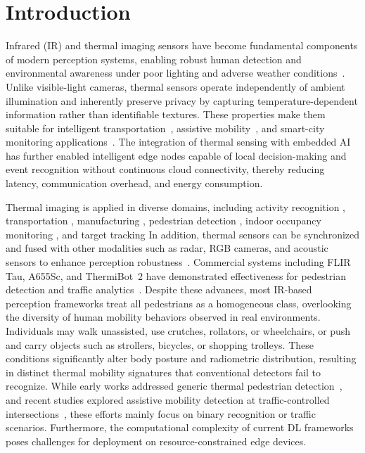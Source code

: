 \documentclass[journal,twoside,web]{ieeecolor}
\begin{document}
\maketitle
\section{Introduction}
Infrared (IR) and thermal imaging sensors have become fundamental components of modern perception systems, enabling robust human detection and environmental awareness under poor lighting and adverse weather conditions~\cite{wilson2023recent}. Unlike visible-light cameras, thermal sensors operate independently of ambient illumination and inherently preserve privacy by capturing temperature-dependent information rather than identifiable textures. These properties make them suitable for intelligent transportation~\cite{zhang2020traffic}, assistive mobility~\cite{breland2021robust}, and smart-city monitoring applications~\cite{guan2018daily}. The integration of thermal sensing with embedded AI has further enabled intelligent edge nodes capable of local decision-making and event recognition without continuous cloud connectivity, thereby reducing latency, communication overhead, and energy consumption.

Thermal imaging is applied in diverse domains, including activity recognition%
, transportation%
, manufacturing%
, pedestrian detection%
, indoor occupancy monitoring%
, and target tracking%
In addition, thermal sensors can be synchronized and fused with other modalities such as radar, RGB cameras, and acoustic sensors to enhance perception robustness~\cite{ding2025fiafusion,cai2025wavefusion}. Commercial systems including FLIR Tau, A655Sc, and ThermiBot~2 have demonstrated effectiveness for pedestrian detection and traffic analytics~\cite{zhang2020traffic,rezzouki2021monitoring,altay2022use}. Despite these advances, most IR-based perception frameworks treat all pedestrians as a homogeneous class, overlooking the diversity of human mobility behaviors observed in real environments. Individuals may walk unassisted, use crutches, rollators, or wheelchairs, or push and carry objects such as strollers, bicycles, or shopping trolleys. These conditions significantly alter body posture and radiometric distribution, resulting in distinct thermal mobility signatures that conventional detectors fail to recognize. While early works addressed generic thermal pedestrian detection~\cite{rezzouki2021monitoring,altay2022use}, and recent studies explored assistive mobility detection at traffic-controlled intersections~\cite{ni2025thermal}, these efforts mainly focus on binary recognition or traffic scenarios. Furthermore, the computational complexity of current DL frameworks poses challenges for deployment on resource-constrained edge devices.
\end{document}
